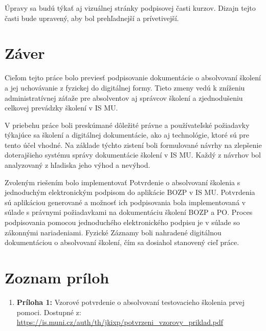 \documentclass[
  digital,     %
  oneside,     %
  nosansbold,  %
  nocolorbold, %
  lof,         %
  nolot,         %
]{fithesis4}
\begin{document}
Úpravy sa budú týkať aj vizuálnej stránky podpisovej časti kurzov. Dizajn tejto časti bude upravený, aby bol prehľadnejší a prívetivejší.

\chapter*{Záver}
Cieľom tejto práce bolo previesť podpisovanie dokumentácie o absolvovaní školení a jej uchovávanie z fyzickej do digitálnej formy. Tieto zmeny vedú k zníženiu administratívnej záťaže pre absolventov aj správcov školení a zjednodušeniu celkovej prevádzky školení v IS MU.

V priebehu práce boli preskúmané dôležité právne a používateľské požiadavky týkajúce sa školení a digitálnej dokumentácie, ako aj technológie, ktoré sú pre tento účel vhodné. Na základe týchto zistení boli formulované návrhy na zlepšenie doterajšieho systému správy dokumentácie školení v IS MU. Každý z návrhov bol analyzovaný z hľadiska jeho výhod a nevýhod.

Zvoleným riešením bolo implementovať Potvrdenie o absolvovaní školenia s jednoduchým elektronickým podpisom do aplikácie BOZP v IS MU. Potvrdenia sú aplikáciou generované a možnosť ich podpisovania bola implementovaná v súlade s právnymi požiadavkami na dokumentáciu školení BOZP a PO. Proces podpisovania pomocou jednoduchého elektronického podpisu je v súlade so zákonnými nariadeniami. Fyzické Záznamy boli nahradené digitálnou dokumentáciou o absolvovaní školení, čím sa dosiahol stanovený cieľ práce.

\chapter*{Zoznam príloh}

\begin{enumerate}
    \item \textbf{Príloha 1:} Vzorové potvrdenie o absolvovaní testovacieho školenia prvej pomoci. Dostupné z: \url{https://is.muni.cz/auth/th/jkixp/potvrzeni_vzorovy_priklad.pdf}\label{priloha1}
\end{enumerate}

\printbibliography[heading=bibintoc] %
\end{document}

